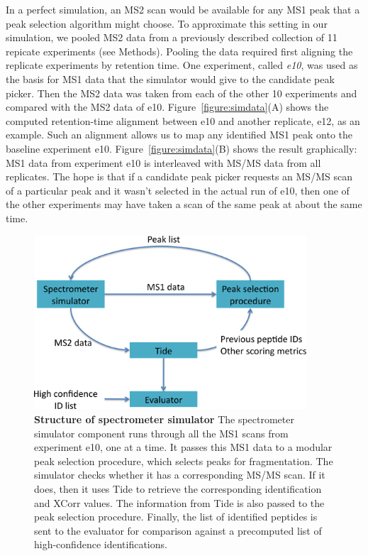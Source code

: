 \documentclass[12pt]{article}
\begin{document}
In a perfect simulation, an MS2 scan would be available for any MS1
peak that a peak selection algorithm might choose. To approximate this
setting in our simulation, we pooled MS2 data from a previously
described collection of 11 repicate experiments \cite{hoopmann:post}
(see Methods).  Pooling the data required first aligning the
replicate experiments by retention time. One experiment, called {\it
  e10}, was used as the basis for MS1 data that the simulator would
give to the candidate peak picker. Then the MS2 data was taken from each
of the other 10 experiments and compared with the MS2 data of
e10. Figure~\ref{figure:simdata}(A) shows the computed retention-time
alignment between e10 and another replicate, e12, as an example. Such
an alignment allows us to map any identified MS1 peak onto the
baseline experiment e10.  Figure~\ref{figure:simdata}(B) shows the
result graphically: MS1 data from experiment e10 is interleaved with
MS/MS data from all replicates. The hope is that if a candidate peak
picker requests an MS/MS scan of a particular peak and it wasn't
selected in the actual run of e10, then one of the other experiments
may have taken a scan of the same peak at about the same time.

\begin{figure}
\centering
\includegraphics[width=4.0in]{simulation.png}
\caption{{\bf Structure of spectrometer
    simulator} The spectrometer simulator component runs through all the MS1
  scans from experiment e10, one at a time. It passes this MS1 data to a modular
  peak selection procedure, which selects peaks for fragmentation. The simulator
  checks whether it has a corresponding MS/MS scan. If it does, then it uses
  Tide to retrieve the corresponding identification and XCorr values. The
  information from Tide is also passed to the peak selection procedure. Finally,
  the list of identified peptides is sent to the evaluator for comparison
  against a precomputed list of high-confidence identifications.
  \label{figure:simulator}}
\end{figure}
\end{document}
